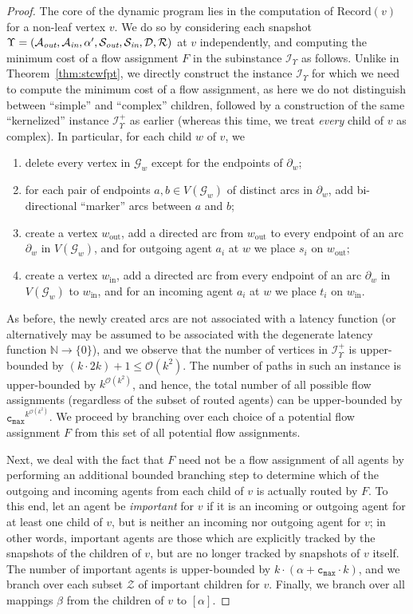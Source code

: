 \documentclass[letterpaper]{article} %
\newcommand{\bigoh}{\ensuremath{{\mathcal O}}}
\newcommand{\cmax}{\mathtt{c_{max}}}
\newcommand{\forgottenG}{\mathcal{G}}
\newcommand{\Rec}{\text{Record}}
\renewcommand{\R}{\mathcal{R}}
\renewcommand{\D}{\mathcal{D}}
\newcommand{\Sout}{\mathcal{S}_\emph{out}}
\newcommand{\Sin}{\mathcal{S}_\emph{in}}
\newcommand{\Aout}{\mathcal{A}_\emph{out}}
\newcommand{\Ain}{\mathcal{A}_\emph{in}}
\newcommand{\Imp}{\mathcal{Z}}
\begin{document}
\begin{proof}
The core of the dynamic program lies in the computation of $\Rec(v)$ for a non-leaf vertex $v$. We do so by considering each snapshot $\Upsilon=(\Aout,\Ain,\alpha',\Sout,\Sin,\D,\R)$ at $v$ independently, and computing the minimum cost of a flow assignment $F$ in the subinstance $\mathcal{I}_\Upsilon$ as follows. Unlike in Theorem~\ref{thm:stcwfpt}, we directly construct the instance $\mathcal{I}_\Upsilon$ for which we need to compute the minimum cost of a flow assignment, as here we do not distinguish between ``simple'' and ``complex'' children, followed by a construction of the same ``kernelized'' instance $\mathcal{I}^+_\Upsilon$ as earlier (whereas this time, we treat \emph{every} child of $v$ as complex).  
In particular, for each child $w$ of $v$, we 
\begin{enumerate}
\item delete every vertex in $\forgottenG_w$ except for the endpoints of $\partial_w$;
\item for each pair of endpoints $a,b\in V(\forgottenG_w)$ of distinct arcs in $\partial_w$, add bi-directional ``marker'' arcs between $a$ and $b$;
\item create a vertex $w_\text{out}$, add a directed arc from $w_\text{out}$ to every endpoint of an arc $\partial_w$ in $V(\forgottenG_w)$, and for outgoing agent $a_i$ at $w$ we place $s_i$ on $w_\text{out}$;
\item create a vertex $w_\text{in}$, add a directed arc from every endpoint of an arc $\partial_w$ in $V(\forgottenG_w)$ to $w_\text{in}$, and for an incoming agent $a_i$ at $w$ we place $t_i$ on $w_\text{in}$.
\end{enumerate}

As before, the newly created arcs are not associated with a latency function (or alternatively may be assumed to be associated with the degenerate latency function $\mathbb{N}\rightarrow \{0\}$), and we observe that the number of vertices in $\mathcal{I}^+_\Upsilon$ is upper-bounded by $(k\cdot 2k)+1\leq \bigoh(k^2)$. The number of paths in such an instance is upper-bounded by $k^{\bigoh(k^2)}$, and hence, the total number of all possible flow assignments (regardless of the subset of routed agents) can be upper-bounded by $\cmax^{k^{\bigoh(k^2)}}$. We proceed by branching over each choice of a potential flow assignment $F$ from this set of all potential flow assignments. 

Next, we deal with the fact that $F$ need not be a flow assignment of all agents by performing an additional bounded branching step to determine which of the outgoing and incoming agents from each child of $v$ is actually routed by $F$. To this end, let an agent be \emph{important} for $v$ if it is an incoming or outgoing agent for at least one child of $v$, but is neither an incoming nor outgoing agent for $v$; in other words, important agents are those which are explicitly tracked by the snapshots of the children of $v$, but are no longer tracked by snapshots of $v$ itself. The number of important agents is upper-bounded by $k\cdot (\alpha+\cmax\cdot k)$, and we branch over each subset $\Imp$ of important children for $v$. Finally, we branch over all mappings $\beta$ from the children of $v$ to $[\alpha]$.



\end{proof}
\end{document}
